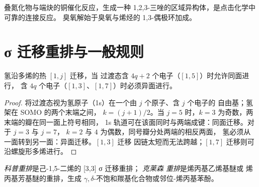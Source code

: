 叠氮化物与端炔的铜催化反应，生成一种
1,2,3-三唑的区域异构体，是点击化学中可靠的连接反应。
臭氧解始于臭氧与烯烃的
1,3-偶极环加成。

\section{σ 迁移重排与一般规则}

\begin{proposition}[氢的迁移]\label{prop:b3:pericyclic:sigmatropic-h}
氢沿多烯的热 $[1, j]$ 迁移，当
过渡态含 $4q + 2$ 个电子（$[1,5]$）时允许同面进行，
含 $4q$ 个电子（$[1,3]$、$[1,7]$）时必须异面进行。
\end{proposition}

\begin{proof}
将过渡态视为氢原子（1s）在一个由 $j$ 个原子、含 $j$ 个电子的
自由基；氢架在 SOMO 的两个末端之间，
$k = (j + 1)/2$。当 $j = 5$ 时，$k = 3$ 为奇数，两末端的瓣在同一面上符号相同，
1s 轨道可在该面同时与两端成键：同面迁移。对于 $j = 3$ 与 $j = 7$，
$k = 2$ 与 $4$ 为偶数，同号瓣分处两端的相反两面，
氢必须从一面转到另一面：异面迁移。$[1,3]$ 迁移
因链太短而无法跨越；$[1,7]$ 迁移则可沿螺旋形多烯进行。
\end{proof}

\begin{definition}[科普重排与克莱森重排]\label{def:b3:pericyclic:cope-claisen}
\emph{科普重排}是己-1,5-二烯的 [3,3] σ 迁移重排；
\emph{克莱森
重排}是烯丙基乙烯基醚或
烯丙基芳基醚的重排，生成 $\gamma,\delta$-不饱和羰基化合物或邻位-烯丙基苯酚。
\end{definition}

